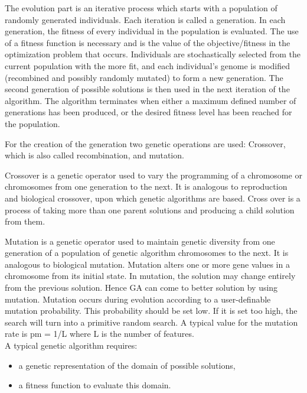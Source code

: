\documentclass[11pt,onecolumn,a4paper]{article}
\begin{document}
The evolution part is an iterative process which starts with a population of randomly generated individuals. Each iteration is called a generation. In each generation, the fitness of every individual in the population is evaluated. The use of a fitness function is necessary and is the value of the objective/fitness in the optimization problem that occurs. Individuals are stochastically selected from the current population with the more fit, and each individual's genome is modified (recombined and possibly randomly mutated) to form a new generation. The second generation of possible solutions is then used in the next iteration of the algorithm. The algorithm terminates when either a maximum defined number of generations has been produced, or the desired fitness level has been reached for the population.\cite{mel1}

For the creation of the generation two genetic operations are used: Crossover, which is also called recombination, and mutation.

Crossover is a genetic operator used to vary the programming of a chromosome or chromosomes from one generation to the next. It is analogous to reproduction and biological crossover, upon which genetic algorithms are based. Cross over is a process of taking more than one parent solutions and producing a child solution from them. \cite{dar1}

Mutation is a genetic operator used to maintain genetic diversity from one generation of a population of genetic algorithm chromosomes to the next. It is analogous to biological mutation. Mutation alters one or more gene values in a chromosome from its initial state. In mutation, the solution may change entirely from the previous solution. Hence GA can come to better solution by using mutation. Mutation occurs during evolution according to a user-definable mutation probability. This probability should be set low. If it is set too high, the search will turn into a primitive random search. A typical value for the mutation rate  is p{\scriptsize m} = 1/L where L is the number of features. \cite{dar2}
\\


A typical genetic algorithm requires:
\begin{itemize}
\item {a genetic representation of the domain of possible solutions,}
\item {a fitness function to evaluate this domain.}
\end{itemize}
\end{document}
